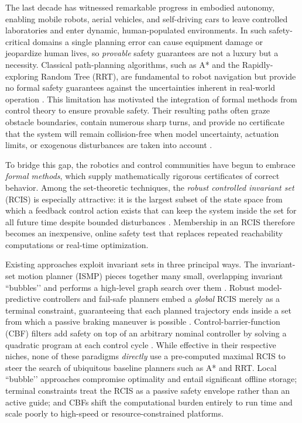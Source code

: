 \documentclass[conference]{IEEEtran}
\begin{document}
 The last decade has witnessed remarkable progress in embodied autonomy, enabling mobile robots, aerial vehicles, and self-driving cars to leave controlled laboratories and enter dynamic, human-populated environments.  In such safety-critical domains a single planning error can cause equipment damage or jeopardize human lives, so \emph{provable} safety guarantees are not a luxury but a necessity.  Classical path-planning algorithms, such as A* and the Rapidly-exploring Random Tree (RRT), are fundamental to robot navigation but provide no formal safety guarantees against the uncertainties inherent in real-world operation \cite{lavalle2006planning}. This limitation has motivated the integration of formal methods from control theory to ensure provable safety.   Their resulting paths often graze obstacle boundaries, contain numerous sharp turns, and provide no certificate that the system will remain collision-free when model uncertainty, actuation limits, or exogenous disturbances are taken into account \cite{elbanhawi2014sampling}.

To bridge this gap, the robotics and control communities have begun to embrace \emph{formal methods}, which supply mathematically rigorous certificates of correct behavior.  Among the set-theoretic techniques, the \textit{robust controlled invariant set} (RCIS) is especially attractive: it is the largest subset of the state space from which a feedback control action exists that can keep the system inside the set for all future time despite bounded disturbances \cite{rakovic2005invariant,rungger2016computing}.  Membership in an RCIS therefore becomes an inexpensive, online safety test that replaces repeated reachability computations or real-time optimization.

Existing approaches exploit invariant sets in three principal ways.  The invariant-set motion planner (ISMP) pieces together many small, overlapping invariant “bubbles’’ and performs a high-level graph search over them \cite{danielson2020motion,danielson2022invariant}.  Robust model-predictive controllers and fail-safe planners embed a \emph{global} RCIS merely as a terminal constraint, guaranteeing that each planned trajectory ends inside a set from which a passive braking maneuver is possible \cite{vaskov2019guaranteed,pek2021fail}.  Control-barrier-function (CBF) filters add safety on top of an arbitrary nominal controller by solving a quadratic program at each control cycle \cite{ames2019control,wang2017safety}.  While effective in their respective niches, none of these paradigms \emph{directly} use a pre-computed maximal RCIS to steer the search of ubiquitous baseline planners such as A* and RRT.  Local “bubble’’ approaches compromise optimality and entail significant offline storage; terminal constraints treat the RCIS as a passive safety envelope rather than an active guide; and CBFs shift the computational burden entirely to run time and scale poorly to high-speed or resource-constrained platforms.
\end{document}
